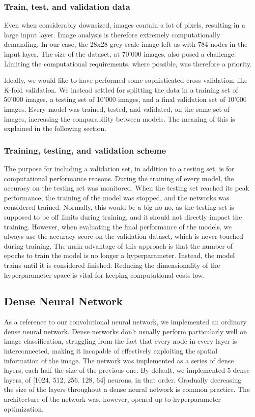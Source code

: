 \documentclass[10pt, twocolumn]{article}
\begin{document}
\subsubsection{Train, test, and validation data}
Even when considerably downsized, images contain a lot of pixels, resulting in a large input layer. Image analysis is therefore extremely computationally demanding. In our case, the 28x28 grey-scale image left us with 784 nodes in the input layer. The size of the dataset, at 70'000 images, also posed a challenge. Limiting the computational requirements, where possible, was therefore a priority.

Ideally, we would like to have performed some sophisticated cross validation, like K-fold validation. We instead settled for splitting the data in a training set of 50'000 images, a testing set of 10'000 images, and a final validation set of 10'000 images. Every model was trained, tested, and validated, on the same set of images, increasing the comparability between models. The meaning of this is explained in the following section.


\subsubsection{Training, testing, and validation scheme}
\label{sec:method_train_test_val}
The purpose for including a validation set, in addition to a testing set, is for computational performance reasons. During the training of every model, the accuracy on the testing set was monitored. When the testing set reached its peak performance, the training of the model was stopped, and the networks was considered trained. Normally, this would be a big no-no, as the testing set is supposed to be off limits during training, and it should not directly impact the training. However, when evaluating the final performance of the models, we always use the accuracy score on the validation dataset, which is never touched during training. The main advantage of this approach is that the number of epochs to train the model is no longer a hyperparameter. Instead, the model trains until it is considered finished. Reducing the dimensionality of the hyperparameter space is vital for keeping computational costs low.



\subsection{Dense Neural Network}
As a reference to our convolutional neural network, we implemented an ordinary dense neural network. Dense networks don't usually perform particularly well on image classification, struggling from the fact that every node in every layer is interconnected, making it incapable of effectively exploiting the spatial information of the image. The network was implemented as a series of dense layers, each half the size of the previous one. By default, we implemented 5 dense layers, of [1024, 512, 256, 128, 64] neurons, in that order. Gradually decreasing the size of the layers throughout a dense neural network is common practice. The architecture of the network was, however, opened up to hyperparameter optimization.
\end{document}
